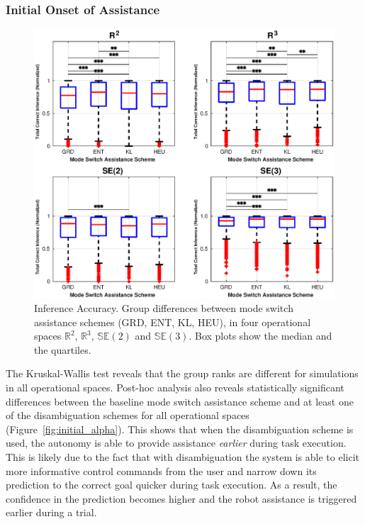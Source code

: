 \documentclass[conference]{IEEEtran}
\begin{document}
\subsubsection{Initial Onset of Assistance}
\begin{figure}[t!]
	\centering
	\includegraphics[width= 1.\hsize, height=0.31\vsize]{./figures/correct_inference.eps}
	\vspace{-0.75cm}
	\caption{Inference Accuracy. Group differences between mode switch assistance schemes (GRD, ENT, KL, HEU), in four operational spaces $\mathbb{R}^2$, $\mathbb{R}^3$, $\mathbb{SE}(2)$ and $\mathbb{SE}(3)$. Box plots show the median and the quartiles.} 
	\label{fig:correct_inference}
\end{figure}

The Kruskal-Wallis test reveals that the group ranks are different for simulations in all operational spaces. Post-hoc analysis also reveals statistically significant differences between the baseline mode switch assistance scheme and at least one of the disambiguation schemes for all operational spaces (Figure~\ref{fig:initial_alpha}). This shows that when the disambiguation scheme is used, the autonomy is able to provide assistance \textit{earlier} during task execution. This is likely due to the fact that with disambiguation the system is able to elicit more informative control commands from the user and narrow down its prediction to the correct goal quicker during task execution. As a result, the confidence in the prediction becomes higher and the robot assistance is triggered earlier during a trial. 
\end{document}
